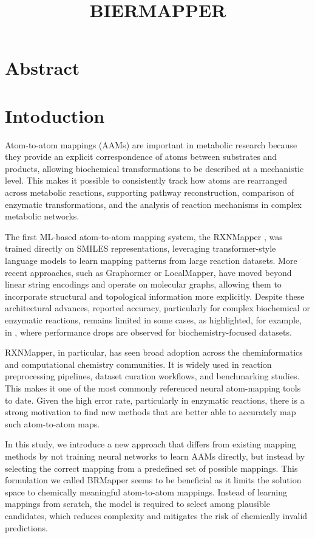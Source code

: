 \documentclass[a4paper,12pt]{article} %
\begin{document}
\title{BIERMAPPER}
\section{Abstract}
\section{Intoduction}

Atom-to-atom mappings (AAMs) are important in metabolic research because they provide an explicit correspondence of atoms between substrates and products, allowing biochemical transformations to be described at a mechanistic level. This makes it possible to consistently track how atoms are rearranged across metabolic reactions, supporting pathway reconstruction, comparison of enzymatic transformations, and the analysis of reaction mechanisms in complex metabolic networks.

The first ML-based atom-to-atom mapping system, the RXNMapper \cite{schwaller2021rxnmapper}, was trained directly on SMILES representations, leveraging transformer-style language models to learn mapping patterns from large reaction datasets. More recent approaches, such as Graphormer or LocalMapper, have moved beyond linear string encodings and operate on molecular graphs, allowing them to incorporate structural and topological information more explicitly. Despite these architectural advances, reported accuracy, particularly for complex biochemical or enzymatic reactions, remains limited in some cases, as highlighted, for example, in \cite{SynTemp:2025}, where performance drops are observed for biochemistry-focused datasets.

RXNMapper, in particular, has seen broad adoption across the cheminformatics and computational chemistry communities. It is widely used in reaction preprocessing pipelines, dataset curation workflows, and benchmarking studies. This makes it one of the most commonly referenced neural atom-mapping tools to date. Given the high error rate, particularly in enzymatic reactions, there is a strong motivation to find new methods that are better able to accurately map such atom-to-atom maps.

In this study, we introduce a new approach that differs from existing mapping methods by not training neural networks to learn AAMs directly, but instead by selecting the correct mapping from a predefined set of possible mappings. This formulation we called BRMapper seems to be beneficial as it limits the solution space to chemically meaningful atom-to-atom mappings. Instead of learning mappings from scratch, the model is required to select among plausible candidates, which reduces complexity and mitigates the risk of chemically invalid predictions.
\end{document}
